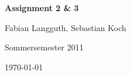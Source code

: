 



\begin{center}
    \huge {\bf Assignment 2 \& 3}
    
    \small Fabian Langguth, Sebastian Koch
    
    Sommersemester 2011
    
    \today
\end{center}






